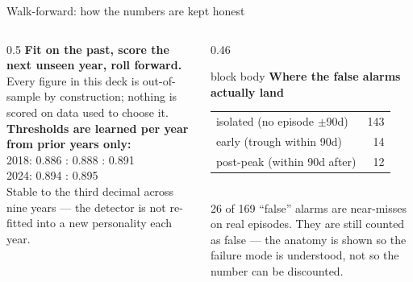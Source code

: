 \documentclass[aspectratio=169,11pt]{beamer}
\begin{document}
\begin{frame}{Walk-forward: how the numbers are kept honest}
  \begin{columns}[T]
    \begin{column}{0.5\linewidth}
      \footnotesize
      \textbf{Fit on the past, score the next unseen year, roll forward.}
      Every figure in this deck is out-of-sample by construction; nothing is
      scored on data used to choose it.
      \vspace{0.6em}
      \\ \textbf{Thresholds are learned per year from prior years only:}
      \\ 2018: 0.886 : 0.888 : 0.891
      \\ 2024: 0.894 : 0.895
      \vspace{0.5em}
      \\ Stable to the third decimal across nine years --- the detector is not
      re-fitted into a new personality each year.
    \end{column}
    \begin{column}{0.46\linewidth}
      \begin{beamercolorbox}[wd=\linewidth,sep=0.8em]{block body}
        \footnotesize
        \textbf{\color{gicnavy}Where the false alarms actually land}
        \\[0.4em]
        \begin{tabular}{@{}lr@{}}
          isolated (no episode $\pm$90d)   & 143 \\
          early (trough within 90d)        & 14 \\
          post-peak (within 90d after)     & 12 \\
        \end{tabular}
        \\[0.5em]
        26 of 169 ``false'' alarms are near-misses on real episodes. They are
        still counted as false --- the anatomy is shown so the failure mode is
        understood, not so the number can be discounted.
      \end{beamercolorbox}
    \end{column}
  \end{columns}
\end{frame}
\end{document}
